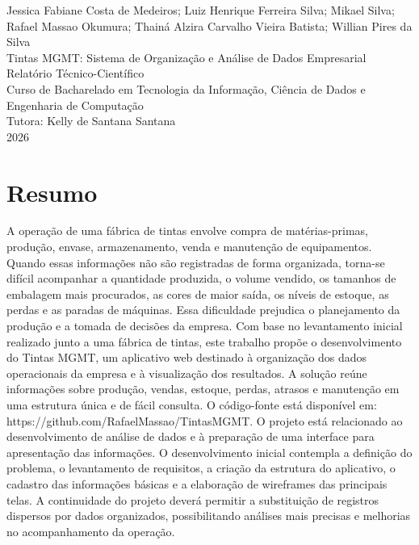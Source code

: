 \documentclass[12pt,a4paper]{article}
\begin{document}
\clearpage
\thispagestyle{empty}

{\centering
Jessica Fabiane Costa de Medeiros; Luiz Henrique Ferreira Silva; Mikael Silva; Rafael Massao Okumura; Thainá Alzira Carvalho Vieira Batista; Willian Pires da Silva\\[0.3cm]
Tintas MGMT: Sistema de Organização e Análise de Dados Empresarial\\[0.3cm]
Relatório Técnico-Científico\\[0.3cm]
Curso de Bacharelado em Tecnologia da Informação, Ciência de Dados e Engenharia de Computação\\[0.3cm]
Tutora: Kelly de Santana Santana\\[0.3cm]
2026\par}
\vspace{1cm}

\section*{Resumo}

{\linespread{1}\selectfont\setlength{\baselineskip}{12pt}
A operação de uma fábrica de tintas envolve compra de matérias-primas, produção, envase, armazenamento, venda e manutenção de equipamentos. Quando essas informações não são registradas de forma organizada, torna-se difícil acompanhar a quantidade produzida, o volume vendido, os tamanhos de embalagem mais procurados, as cores de maior saída, os níveis de estoque, as perdas e as paradas de máquinas. Essa dificuldade prejudica o planejamento da produção e a tomada de decisões da empresa. Com base no levantamento inicial realizado junto a uma fábrica de tintas, este trabalho propõe o desenvolvimento do Tintas MGMT, um aplicativo web destinado à organização dos dados operacionais da empresa e à visualização dos resultados. A solução reúne informações sobre produção, vendas, estoque, perdas, atrasos e manutenção em uma estrutura única e de fácil consulta. O código-fonte está disponível em: https://github.com/RafaelMassao/TintasMGMT. O projeto está relacionado ao desenvolvimento de análise de dados e à preparação de uma interface para apresentação das informações. O desenvolvimento inicial contempla a definição do problema, o levantamento de requisitos, a criação da estrutura do aplicativo, o cadastro das informações básicas e a elaboração de wireframes das principais telas. A continuidade do projeto deverá permitir a substituição de registros dispersos por dados organizados, possibilitando análises mais precisas e melhorias no acompanhamento da operação.
\par}
\end{document}
